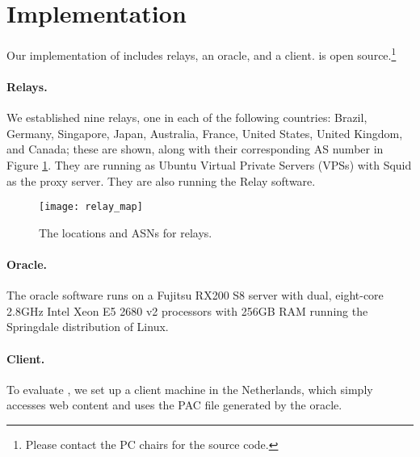 \section{Implementation}

Our implementation of \system{} includes relays, an oracle, and 
a client. \system{} is open source.\footnote{Please
  contact the PC chairs for the source code.}

\paragraph{Relays.}  We established nine relays, one in each of the following countries: Brazil, 
Germany, Singapore, Japan, Australia, France, United States, United Kingdom, and Canada; these 
are shown, along with their corresponding AS number in Figure \ref{fig:relay_locations}.  
They are running as Ubuntu Virtual Private Servers (VPSs) with 
Squid as the proxy server.  They are also running the \system{} Relay software.

\begin{figure}[t!]
\centering
\texttt{[image: relay\_map]}
\caption{The locations and ASNs for \system{} relays.}
\label{fig:relay_locations}
\end{figure}

\paragraph{Oracle.}  The oracle software runs on a Fujitsu RX200 S8 server with dual, 
eight-core 2.8GHz Intel Xeon E5 2680 v2 processors with 256GB RAM running the 
Springdale distribution of Linux. 

\paragraph{Client.} To evaluate \system{}, we set up a client 
machine in the Netherlands, which simply accesses web content and uses the PAC 
file generated by the oracle. 
